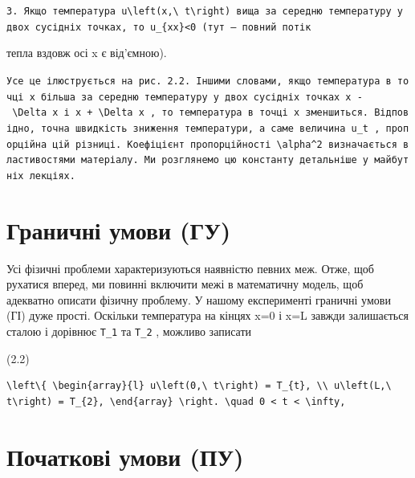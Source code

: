 \documentclass[
  ukrainian,
]{article}
\begin{document}
\texttt{3.\ Якщо\ температура\ \textquotesingle{}u\textbackslash{}left(x,\textbackslash{}\ t\textbackslash{}right)\textquotesingle{}\ вища\ за\ середню\ температуру\ у\ двох\ сусідніх\ точках,\ то\ \textquotesingle{}u\_\{xx\}\textless{}0\textquotesingle{}\ (тут\ —\ повний\ потік}

тепла вздовж осі x є від'ємною).

\texttt{Усе\ це\ ілюструється\ на\ рис.\ 2.2.\ Іншими\ словами,\ якщо\ температура\ в\ точці\ x\ більша\ за\ середню\ температуру\ у\ двох\ сусідніх\ точках\ \textquotesingle{}x\ -\ \textbackslash{}Delta\ x\textquotesingle{}\ і\ \textquotesingle{}x\ +\ \textbackslash{}Delta\ x\textquotesingle{}\ ,\ то\ температура\ в\ точці\ x\ зменшиться.\ Відповідно,\ точна\ швидкість\ зниження\ температури,\ а\ саме\ величина\ \textquotesingle{}u\_t\textquotesingle{}\ ,\ пропорційна\ цій\ різниці.\ Коефіцієнт\ пропорційності\ \textquotesingle{}\textbackslash{}alpha\^{}2\textquotesingle{}\ визначається\ властивостями\ матеріалу.\ Ми\ розглянемо\ цю\ константу\ детальніше\ у\ майбутніх\ лекціях.}

\section{Граничні умови
(ГУ)}\label{ux433ux440ux430ux43dux438ux447ux43dux456-ux443ux43cux43eux432ux438-ux433ux443}

Усі фізичні проблеми характеризуються наявністю певних меж. Отже, щоб
рухатися вперед, ми повинні включити межі в математичну модель, щоб
адекватно описати фізичну проблему. У нашому експерименті граничні умови
(ГІ) дуже прості. Оскільки температура на кінцях x=0 і x=L завжди
залишається сталою і дорівнює \texttt{T\_1} та \texttt{T\_2} , можливо
записати

(2.2)

\begin{verbatim}
\left\{ \begin{array}{l} u\left(0,\ t\right) = T_{t}, \\ u\left(L,\ t\right) = T_{2}, \end{array} \right. \quad 0 < t < \infty,
\end{verbatim}

\section{Початкові умови
(ПУ)}\label{ux43fux43eux447ux430ux442ux43aux43eux432ux456-ux443ux43cux43eux432ux438-ux43fux443}
\end{document}
